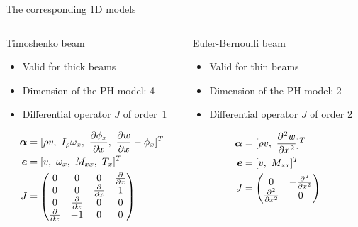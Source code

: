 \documentclass{beamer}
\begin{document}
\begin{frame}{The corresponding 1D models}
\begin{columns}
	\begin{column}[t]{0.5\textwidth}
		\begin{block}{Timoshenko beam}
			\begin{itemize}
				\item Valid for thick beams \\
				\item Dimension of the PH model: 4 \\
				\item Differential operator $J$ of order~1 \\
			\end{itemize}
		\end{block}
		\begin{equation*}
		\begin{aligned}
		\bm{\alpha} &= [\rho v, \ I_{\rho} \omega_x, \ \diffp{\phi_x}{x}, \ \diffp{w}{x} - \phi_x]^T \\
		\bm{e} &= [v, \ \omega_x, \ M_{xx}, \ T_x ]^T \\
		J &= 
		\begin{pmatrix}
		0 & 0 & 0 &  \diffp{}{x} \\
		0 & 0 & \diffp{}{x} & 1  \\
		0 & \diffp{}{x} & 0 & 0  \\
		\diffp{}{x} & -1 & 0 & 0 \\
		\end{pmatrix}	
		\end{aligned}
		\end{equation*}
	\end{column}
	\begin{column}[t]{0.45\textwidth}
		\begin{block}{Euler-Bernoulli beam}
			\begin{itemize}
				\item Valid for thin beams \\
				\item Dimension of the PH model: 2 \\
				\item Differential operator $J$ of order 2 \\
			\end{itemize}
		\end{block}
	\begin{equation*}
	\begin{aligned}
	\bm{\alpha} &= [\rho v, \ \diffp[2]{w}{x}]^T \\
	\bm{e} &= [v, \ M_{xx}]^T \\
	J &= 
	\begin{pmatrix}
	0 &  -\diffp[2]{}{x} \\
	\diffp[2]{}{x} & 0  \\
	\end{pmatrix}
	\end{aligned}
	\end{equation*}
	\end{column}	
\end{columns}
\end{frame}
\end{document}
